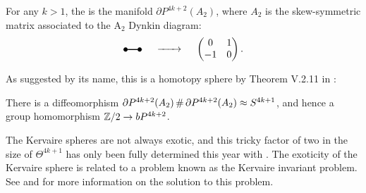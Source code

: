 \begin{definition}
	For any $k>1$, the  is the manifold $\partial P^{4k+2}(A_2)$, where $A_2$ is the skew-symmetric matrix associated to the $\mathrm{A}_2$ Dynkin diagram:
\[
	\begin{tikzpicture}%
		\tikzset{dynode/.style={circle, draw, fill=black,
					minimum size=4pt, inner sep=0pt}}
		\tikzset{dyline/.style={line width=1pt}}
		\tikzset{dydash/.style={line width=1pt, dashed}}


		\node[dynode] (a1) at (0,0.5) {};
		\node[dynode] (a2) at (0.5,0.5) {};

		\draw[dyline] (a1) -- (a2);
	\end{tikzpicture}
	\quad\lkxto\quad
	\begin{pmatrix}
		0  & 1 \\
		-1 & 0
	\end{pmatrix}.
\]
\end{definition}

As suggested by its name, this is a homotopy sphere by Theorem V.2.11 in \cite{browder1972surgery}: 

\begin{theorem}
There is a diffeomorphism $\partial P^{4k+2}(A_2)\+ \partial P^{4k+2}(A_2) \cong S^{4k+1}$, and hence a group homomorphism $\mathbb{Z}/2 \to bP^{4k+2}$.
\end{theorem}

The Kervaire spheres are not always exotic, and this tricky factor of two in the size of $\Theta^{4k+1}$ has only been fully determined this year with \cite{lin2025kervaireinvariantproblem}. The exoticity of the Kervaire sphere is related to a problem known as the Kervaire invariant problem. See \cite{browder1969kervaireinvariant} and \cite{hillhopkinsravanel2016} for more information on the solution to this problem.
